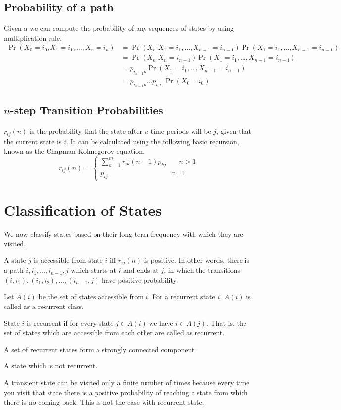 \subsection{Probability of a path}
Given a \MC we can compute the probability of any sequences of states by using multiplication rule.
\begin{align*}
    \Pr(X_0=i_0,X_1=i_1,\ldots,X_n=i_n) &= \Pr(X_n|X_1=i_1,\ldots,X_{n-1}=i_{n-1})\Pr(X_1=i_1,\ldots,X_{n-1}=i_{n-1}) \\
    &= \Pr(X_n|X_n=i_{n-1})\Pr(X_1=i_1,\ldots,X_{n-1}= i_{n-1}) \\
    &= p_{i_{n-1} n}\Pr(X_1=i_1,\ldots,X_{n-1}=i_{n-1}) \\
    &= p_{i_{n-1}n} \ldots p_{i_0i_1} \Pr(X_0=i_0)
\end{align*}

\subsection{$n$-step Transition Probabilities}
$r_{ij}(n)$ is the probability that the state after $n$ time periods will be $j$, given that the current state is $i$. It can be calculated using the following basic recursion, known as the Chapman-Kolmogorov equation.
\[r_{ij}(n)=\begin{cases}
    \sum_{k=1}^{m}r_{ik}(n-1)p_{kj} & \quad n>1 \\
    p_{ij} & \text{n=1}
\end{cases}\]

\section{Classification of States}
We now classify states based on their long-term frequency with which they are visited.

\begin{definition}[Accessible]
    A state $j$ is accessible from state $i$ iff $r_{ij}(n)$ is positive. In other words, there is a path $i,i_1,\ldots,i_{n-1},j$ which starts at $i$ and ends at $j$, in which the transitions $(i,i_1), (i_1,i_2), \ldots, (i_{n-1},j)$ have positive probability.
\end{definition}
Let $A(i)$ be the set of states accessible from $i$. For a recurrent state $i$, $A(i)$ is called as a recurrent class.
\begin{definition}[Recurrent]
    State $i$ is recurrent if for every state $j\in A(i)$ we have $i \in A(j)$. That is, the set of states which are accessible from each other are called as recurrent.
\end{definition}
\begin{remark}
    A set of recurrent states form a strongly connected component.
\end{remark}
\begin{definition}[Transient]
    A state which is not recurrent.
\end{definition}
A transient state can be visited only a finite number of times because every time you visit that state there is a positive probability of reaching a state from which there is no coming back. This is not the case with recurrent state.

